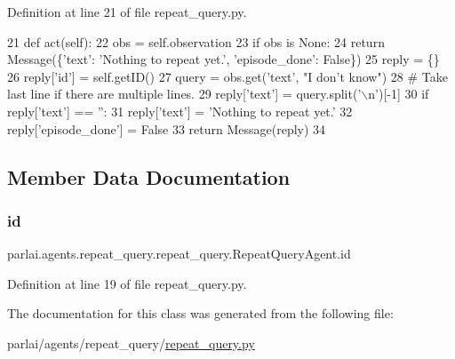 Definition at line 21 of file repeat\+\_\+query.\+py.


\begin{DoxyCode}
21     \textcolor{keyword}{def }act(self):
22         obs = self.observation
23         \textcolor{keywordflow}{if} obs \textcolor{keywordflow}{is} \textcolor{keywordtype}{None}:
24             \textcolor{keywordflow}{return} Message(\{\textcolor{stringliteral}{'text'}: \textcolor{stringliteral}{'Nothing to repeat yet.'}, \textcolor{stringliteral}{'episode\_done'}: \textcolor{keyword}{False}\})
25         reply = \{\}
26         reply[\textcolor{stringliteral}{'id'}] = self.getID()
27         query = obs.get(\textcolor{stringliteral}{'text'}, \textcolor{stringliteral}{"I don't know"})
28         \textcolor{comment}{# Take last line if there are multiple lines.}
29         reply[\textcolor{stringliteral}{'text'}] = query.split(\textcolor{stringliteral}{'\(\backslash\)n'})[-1]
30         \textcolor{keywordflow}{if} reply[\textcolor{stringliteral}{'text'}] == \textcolor{stringliteral}{''}:
31             reply[\textcolor{stringliteral}{'text'}] = \textcolor{stringliteral}{'Nothing to repeat yet.'}
32         reply[\textcolor{stringliteral}{'episode\_done'}] = \textcolor{keyword}{False}
33         \textcolor{keywordflow}{return} Message(reply)
34 \end{DoxyCode}


\subsection{Member Data Documentation}
\mbox{\label{classparlai_1_1agents_1_1repeat__query_1_1repeat__query_1_1RepeatQueryAgent_ab6fbd1dbd2b197d0ab72d3f9f11c9d8a}} 
\subsubsection{\texorpdfstring{id}{id}}
{\footnotesize\ttfamily parlai.\+agents.\+repeat\+\_\+query.\+repeat\+\_\+query.\+Repeat\+Query\+Agent.\+id}



Definition at line 19 of file repeat\+\_\+query.\+py.



The documentation for this class was generated from the following file\+:\begin{DoxyCompactItemize}
\item 
parlai/agents/repeat\+\_\+query/\hyperlink{repeat__query_8py}{repeat\+\_\+query.\+py}\end{DoxyCompactItemize}
